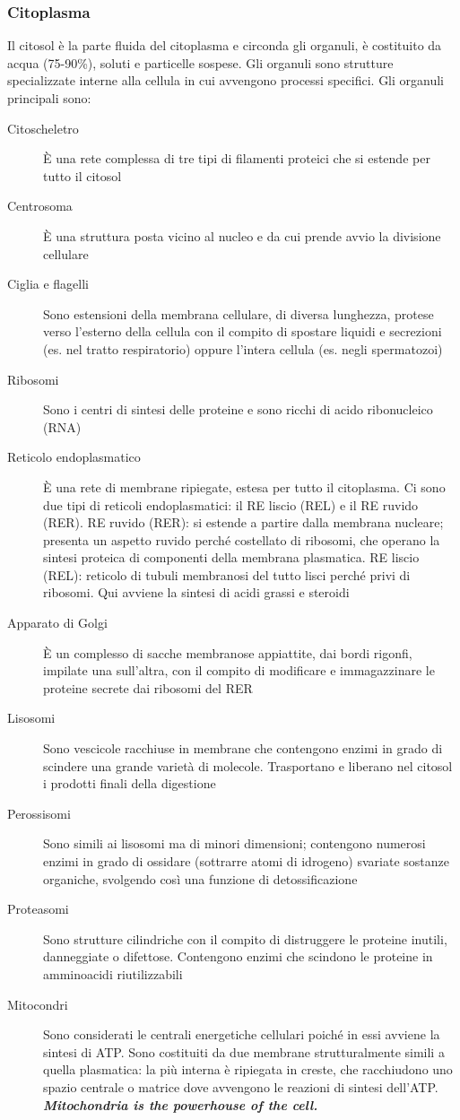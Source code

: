 \documentclass[a4paper]{article}
\begin{document}
\subsubsection{Citoplasma}
Il citosol è la parte fluida del citoplasma e circonda gli organuli, è 
costituito da acqua (75-90\%), soluti e particelle sospese. Gli organuli sono
strutture specializzate interne alla cellula in cui avvengono processi
specifici. Gli organuli principali sono:
\begin{description}
\item[Citoscheletro] È una rete complessa di tre tipi di filamenti proteici 
che si estende per tutto il citosol
\item[Centrosoma] È una struttura posta vicino al nucleo e da cui prende avvio 
la divisione cellulare
\item[Ciglia e flagelli] Sono estensioni della membrana cellulare, di diversa 
lunghezza, protese verso l’esterno della cellula con il compito di spostare 
liquidi e secrezioni (es. nel tratto respiratorio) oppure l’intera cellula
(es. negli spermatozoi)
\item[Ribosomi] Sono i centri di sintesi delle proteine e sono ricchi di acido 
ribonucleico (RNA)
\item[Reticolo endoplasmatico] È una rete di membrane ripiegate, estesa per 
tutto il citoplasma. Ci sono due tipi di reticoli endoplasmatici: il RE liscio 
(REL) e il RE ruvido (RER). RE ruvido (RER): si estende a partire dalla 
membrana nucleare; presenta un aspetto ruvido perché costellato di ribosomi, 
che operano la sintesi proteica di componenti della membrana plasmatica. RE 
liscio (REL): reticolo di tubuli membranosi del tutto lisci perché privi di 
ribosomi. Qui avviene la sintesi di acidi grassi e steroidi
\item[Apparato di Golgi] È un complesso di sacche membranose appiattite, dai 
bordi rigonfi, impilate una sull’altra, con il compito di modificare e 
immagazzinare le proteine secrete dai ribosomi del RER
\item[Lisosomi] Sono vescicole racchiuse in membrane che contengono enzimi in 
grado di scindere una grande varietà di molecole. Trasportano e liberano nel 
citosol i prodotti finali della digestione
\item[Perossisomi] Sono simili ai lisosomi ma di minori dimensioni; contengono 
numerosi enzimi in grado di ossidare (sottrarre atomi di idrogeno) svariate 
sostanze organiche, svolgendo così una funzione di detossificazione
\item[Proteasomi] Sono strutture cilindriche con il compito di distruggere le 
proteine inutili, danneggiate o difettose. Contengono enzimi che scindono le 
proteine in amminoacidi riutilizzabili
\item[Mitocondri] Sono considerati le centrali energetiche cellulari poiché in 
essi avviene la sintesi di ATP. Sono costituiti da due membrane strutturalmente 
simili a quella plasmatica: la più interna è ripiegata in creste, che 
racchiudono uno spazio centrale o matrice dove avvengono le reazioni di 
sintesi dell’ATP. \textit{\textbf{Mitochondria is the powerhouse of the cell.}}
\end{description}
\end{document}

